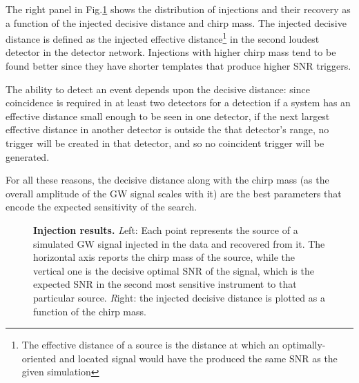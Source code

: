 \documentclass[binding=0.6cm, LaM]{sapthesis}
\begin{document}
        The right panel in Fig.\ref{fig:inj_plots} shows the distribution of injections and their recovery
        as a function of the injected decisive distance and chirp mass.
        The injected decisive distance is defined as the injected effective
        distance\footnote{The effective distance of a source is the distance at which an optimally-oriented and located signal would have the produced the same SNR as the given simulation }
        in the second loudest detector in the detector network.
	Injections with higher chirp mass tend to be found better 
	since they have shorter templates that produce higher SNR triggers. 

        The ability to detect an event depends upon the decisive distance:
        since coincidence is required in at least two detectors for a detection
        if a system has an effective distance small enough to be seen in one detector,
        if the next largest effective distance in another detector is outside the that detector’s range,
        no trigger will be created in that detector, and so no coincident trigger will be generated.

        For all these reasons, the decisive distance along with the chirp mass
        (as the overall amplitude of the GW signal scales with it)
        are the best parameters that encode the expected sensitivity of the search.

         \begin{figure}[t]
          \noindent
          \label{inj_plots}
          \centering
          \caption{{\bf Injection results.} {\textit Left:} Each point represents the source of a simulated GW signal injected in the data and recovered from it.  The horizontal axis reports the chirp mass of the source, while the vertical one is the decisive optimal SNR of the signal, which is the expected SNR in the second most sensitive instrument to that particular source. {\textit Right:} the injected decisive distance is plotted as a function of the chirp mass.}
          \label{fig:inj_plots}
        \end{figure}
\end{document}
